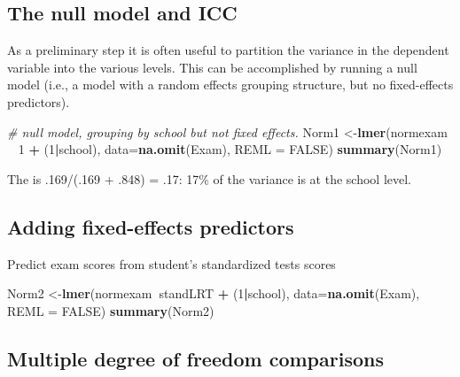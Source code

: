 \documentclass[]{book}
\newenvironment{Shaded}{\begin{snugshade}}{\end{snugshade}}
\newcommand{\KeywordTok}[1]{\textcolor[rgb]{0.13,0.29,0.53}{\textbf{#1}}}
\newcommand{\DataTypeTok}[1]{\textcolor[rgb]{0.13,0.29,0.53}{#1}}
\newcommand{\DecValTok}[1]{\textcolor[rgb]{0.00,0.00,0.81}{#1}}
\newcommand{\StringTok}[1]{\textcolor[rgb]{0.31,0.60,0.02}{#1}}
\newcommand{\CommentTok}[1]{\textcolor[rgb]{0.56,0.35,0.01}{\textit{#1}}}
\newcommand{\OtherTok}[1]{\textcolor[rgb]{0.56,0.35,0.01}{#1}}
\newcommand{\OperatorTok}[1]{\textcolor[rgb]{0.81,0.36,0.00}{\textbf{#1}}}
\newcommand{\NormalTok}[1]{#1}
\begin{document}
\subsection{The null model and ICC}\label{the-null-model-and-icc}

As a preliminary step it is often useful to partition the variance in
the dependent variable into the various levels. This can be accomplished
by running a null model (i.e., a model with a random effects grouping
structure, but no fixed-effects predictors).

\begin{Shaded}
\begin{Highlighting}[]
  \CommentTok{# null model, grouping by school but not fixed effects.}
\NormalTok{  Norm1 <-}\KeywordTok{lmer}\NormalTok{(normexam }\OperatorTok{~}\StringTok{ }\DecValTok{1} \OperatorTok{+}\StringTok{ }\NormalTok{(}\DecValTok{1}\OperatorTok{|}\NormalTok{school),}
                \DataTypeTok{data=}\KeywordTok{na.omit}\NormalTok{(Exam), }\DataTypeTok{REML =} \OtherTok{FALSE}\NormalTok{)}
  \KeywordTok{summary}\NormalTok{(Norm1)}
\end{Highlighting}
\end{Shaded}

The is .169/(.169 + .848) = .17: 17\% of the variance is at the school
level.

\subsection{Adding fixed-effects
predictors}\label{adding-fixed-effects-predictors}

Predict exam scores from student's standardized tests scores

\begin{Shaded}
\begin{Highlighting}[]
\NormalTok{  Norm2 <-}\KeywordTok{lmer}\NormalTok{(normexam}\OperatorTok{~}\NormalTok{standLRT }\OperatorTok{+}\StringTok{ }\NormalTok{(}\DecValTok{1}\OperatorTok{|}\NormalTok{school),}
               \DataTypeTok{data=}\KeywordTok{na.omit}\NormalTok{(Exam),}
               \DataTypeTok{REML =} \OtherTok{FALSE}\NormalTok{) }
  \KeywordTok{summary}\NormalTok{(Norm2) }
\end{Highlighting}
\end{Shaded}

\subsection{Multiple degree of freedom
comparisons}\label{multiple-degree-of-freedom-comparisons}
\end{document}
